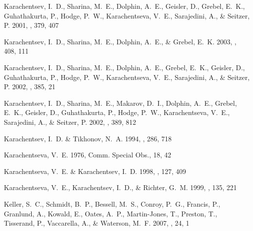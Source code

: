 \documentclass[manuscript]{aastex}
\begin{document}
\begin{thebibliography}{381}
{Karachentsev}, I.~D., {Sharina}, M.~E., {Dolphin}, A.~E., {Geisler}, D.,
  {Grebel}, E.~K., {Guhathakurta}, P., {Hodge}, P.~W., {Karachentseva}, V.~E.,
  {Sarajedini}, A., \& {Seitzer}, P. 2001{}, \aap, 379, 407

{Karachentsev}, I.~D., {Sharina}, M.~E., {Dolphin}, A.~E., \& {Grebel}, E.~K.
  2003{}, \aap, 408, 111

{Karachentsev}, I.~D., {Sharina}, M.~E., {Dolphin}, A.~E., {Grebel}, E.~K.,
  {Geisler}, D., {Guhathakurta}, P., {Hodge}, P.~W., {Karachentseva}, V.~E.,
  {Sarajedini}, A., \& {Seitzer}, P. 2002{}, \aap, 385, 21

{Karachentsev}, I.~D., {Sharina}, M.~E., {Makarov}, D.~I., {Dolphin}, A.~E.,
  {Grebel}, E.~K., {Geisler}, D., {Guhathakurta}, P., {Hodge}, P.~W.,
  {Karachentseva}, V.~E., {Sarajedini}, A., \& {Seitzer}, P.
  2002{}, \aap, 389, 812

{Karachentsev}, I.~D. \& {Tikhonov}, N.~A. 1994, \aap, 286, 718

{Karachentseva}, V.~E. 1976, Comm. Special Obs., 18, 42

{Karachentseva}, V.~E. \& {Karachentsev}, I.~D. 1998, \aaps, 127, 409

{Karachentseva}, V.~E., {Karachentsev}, I.~D., \& {Richter}, G.~M. 1999, \aaps,
  135, 221

{Keller}, S.~C., {Schmidt}, B.~P., {Bessell}, M.~S., {Conroy}, P.~G.,
  {Francis}, P., {Granlund}, A., {Kowald}, E., {Oates}, A.~P., {Martin-Jones},
  T., {Preston}, T., {Tisserand}, P., {Vaccarella}, A., \& {Waterson}, M.~F.
  2007, \pasa, 24, 1


\end{thebibliography}
\end{document}
